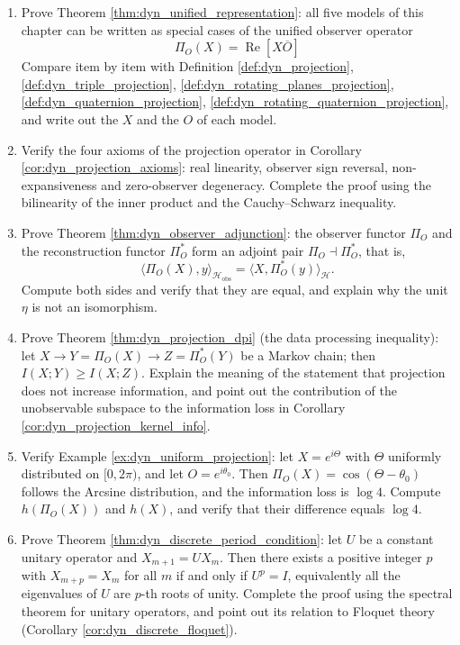 \begin{enumerate}[leftmargin=3em, label=\textbf{Exercise \arabic*}]
    \item Prove Theorem \ref{thm:dyn_unified_representation}:
    all five models of this chapter can be written as special cases of the unified observer operator
    \[
    \Pi_O(X)=\operatorname{Re}[X\overline{O}]
    \]
    Compare item by item with Definition \ref{def:dyn_projection}, \ref{def:dyn_triple_projection},
    \ref{def:dyn_rotating_planes_projection}, \ref{def:dyn_quaternion_projection},
    \ref{def:dyn_rotating_quaternion_projection},
    and write out the $X$ and the $O$ of each model.

    \item Verify the four axioms of the projection operator in Corollary \ref{cor:dyn_projection_axioms}:
    real linearity, observer sign reversal, non-expansiveness and zero-observer degeneracy.
    Complete the proof using the bilinearity of the inner product and the Cauchy--Schwarz inequality.

    \item Prove Theorem \ref{thm:dyn_observer_adjunction}:
    the observer functor $\Pi_O$ and the reconstruction functor $\Pi_O^\ast$ form an adjoint pair
    $\Pi_O\dashv\Pi_O^\ast$,
    that is,
    \[
    \langle\Pi_O(X),y\rangle_{\mathcal{H}_{\text{obs}}}
    =\langle X,\Pi_O^\ast(y)\rangle_{\mathcal{H}}.
    \]
    Compute both sides and verify that they are equal, and explain why the unit $\eta$ is not an isomorphism.

    \item Prove Theorem \ref{thm:dyn_projection_dpi} (the data processing inequality):
    let $X\to Y=\Pi_O(X)\to Z=\Pi_O^\ast(Y)$ be a Markov chain;
    then $I(X;Y)\ge I(X;Z)$.
    Explain the meaning of the statement that projection does not increase information,
    and point out the contribution of the unobservable subspace to the information loss
    in Corollary \ref{cor:dyn_projection_kernel_info}.

    \item Verify Example \ref{ex:dyn_uniform_projection}:
    let $X=e^{i\Theta}$ with $\Theta$ uniformly distributed on $[0,2\pi)$, and let
    $O=e^{i\theta_0}$. Then $\Pi_O(X)=\cos(\Theta-\theta_0)$
    follows the Arcsine distribution, and the information loss is $\log 4$.
    Compute $h(\Pi_O(X))$ and $h(X)$, and verify that their difference equals $\log 4$.

    \item Prove Theorem \ref{thm:dyn_discrete_period_condition}:
    let $U$ be a constant unitary operator and $X_{m+1}=UX_m$.
    Then there exists a positive integer $p$ with $X_{m+p}=X_m$ for all $m$
    if and only if $U^p=I$, equivalently all the eigenvalues of $U$ are $p$-th roots of unity.
    Complete the proof using the spectral theorem for unitary operators,
    and point out its relation to Floquet theory (Corollary \ref{cor:dyn_discrete_floquet}).


\end{enumerate}
